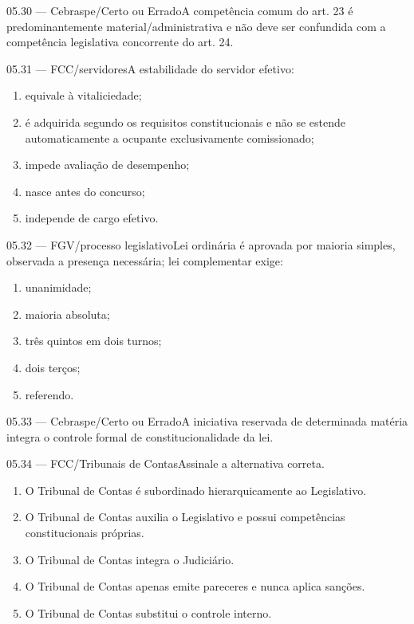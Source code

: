\begin{questao}{ 05.30 — Cebraspe/Certo ou Errado}A competência comum do art. 23 é predominantemente material/administrativa e não deve ser confundida com a competência legislativa concorrente do art. 24.\end{questao}
\begin{questao}{ 05.31 — FCC/servidores}A estabilidade do servidor efetivo:\begin{enumerate}[label=\Alph*)]\item equivale à vitaliciedade;\item é adquirida segundo os requisitos constitucionais e não se estende automaticamente a ocupante exclusivamente comissionado;\item impede avaliação de desempenho;\item nasce antes do concurso;\item independe de cargo efetivo.\end{enumerate}\end{questao}
\begin{questao}{ 05.32 — FGV/processo legislativo}Lei ordinária é aprovada por maioria simples, observada a presença necessária; lei complementar exige:\begin{enumerate}[label=\Alph*)]\item unanimidade;\item maioria absoluta;\item três quintos em dois turnos;\item dois terços;\item referendo.\end{enumerate}\end{questao}
\begin{questao}{ 05.33 — Cebraspe/Certo ou Errado}A iniciativa reservada de determinada matéria integra o controle formal de constitucionalidade da lei.\end{questao}
\begin{questao}{ 05.34 — FCC/Tribunais de Contas}Assinale a alternativa correta.\begin{enumerate}[label=\Alph*)]\item O Tribunal de Contas é subordinado hierarquicamente ao Legislativo.\item O Tribunal de Contas auxilia o Legislativo e possui competências constitucionais próprias.\item O Tribunal de Contas integra o Judiciário.\item O Tribunal de Contas apenas emite pareceres e nunca aplica sanções.\item O Tribunal de Contas substitui o controle interno.\end{enumerate}\end{questao}
